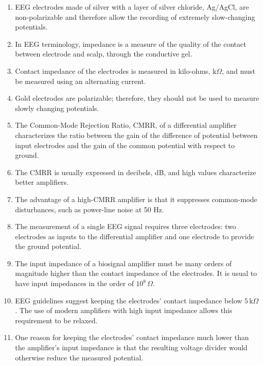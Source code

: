 \begin{enumerate}[label=\arabic*.]
    \item EEG electrodes made of silver with a layer of silver chloride, Ag/AgCl, are non-polarizable and therefore allow the recording of extremely slow-changing potentials.
    
    \item In EEG terminology, impedance is a measure of the quality of the contact between electrode and scalp, through the conductive gel.
    
    \item Contact impedance of the electrodes is measured in kilo-ohms, $\text{k}\Omega$, and must be measured using an alternating current.
    
    \item Gold electrodes are polarizable; therefore, they should not be used to measure slowly changing potentials.
    
    \item The Common-Mode Rejection Ratio, CMRR, of a differential amplifier characterizes the ratio between the gain of the difference of potential between input electrodes and the gain of the common potential with respect to ground.
    
    \item The CMRR is usually expressed in decibels, dB, and high values characterize better amplifiers.
    
    \item The advantage of a high-CMRR amplifier is that it suppresses common-mode disturbances, such as power-line noise at 50 Hz.
    
    \item The measurement of a single EEG signal requires three electrodes: two electrodes as inputs to the differential amplifier and one electrode to provide the ground potential.
    
    \item The input impedance of a biosignal amplifier must be many orders of magnitude higher than the contact impedance of the electrodes. It is usual to have input impedances in the order of $10^8\,\Omega$.
    
    \item EEG guidelines suggest keeping the electrodes' contact impedance below $5\,\text{k}\Omega$. The use of modern amplifiers with high input impedance allows this requirement to be relaxed.
    
    \item One reason for keeping the electrodes' contact impedance much lower than the amplifier's input impedance is that the resulting voltage divider would otherwise reduce the measured potential.
    

\end{enumerate}
